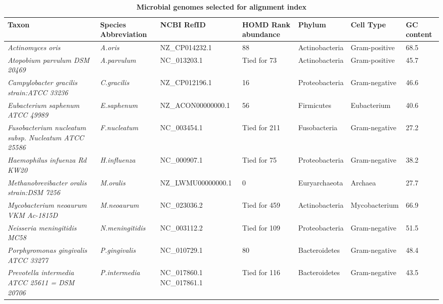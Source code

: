 \documentclass[12pt, a4paper]{article}
\renewcommand{\arraystretch}{1.2}
\newcommand{\ra}[1]{\renewcommand{\arraystretch}{#1}}
\begin{document}
\begin{landscape}
\begin{table}[h]
\centering\footnotesize
\ra{1.3}
\setlength{\tabcolsep}{6pt} %
	\caption[Microbial genomes selected for alignment index]{\textbf{Microbial genomes selected for alignment index}}\label{table:15microbes}
		\begin{tabular}{C{7cm} C{2.5cm} C{3.5cm} C{2cm} C{2.5cm} C{2.5cm} C{1.5cm} }
		\toprule
		\Centering\bfseries Taxon & \Centering\bfseries Species Abbreviation & \Centering\bfseries NCBI RefID & \Centering\bfseries HOMD Rank abundance & \Centering\bfseries Phylum & \Centering\bfseries Cell Type & \Centering\bfseries GC content \\[5pt] \midrule
		{\textit{Actinomyces oris}}&{\textit{A.oris}}&{NZ\_CP014232.1}&{88}&{Actinobacteria}&{Gram-positive}&{68.5}\\[5pt]
		{\textit{Atopobium parvulum DSM 20469}}&{\textit{A.parvulum}}&{NC\_013203.1}&{Tied for 73}&{Actinobacteria}&{Gram-positive}&{45.7}\\[5pt]
		{\textit{Campylobacter gracilis strain:ATCC 33236}}&{\textit{C.gracilis}}&{NZ\_CP012196.1}&{16}&{Proteobacteria}&{Gram-negative}&{46.6}\\[5pt]
		{\textit{Eubacterium saphenum ATCC 49989}}&{\textit{E.saphenum}}&{NZ\_ACON00000000.1}&{56}&{Firmicutes}&{Eubacterium}&{40.6}\\[5pt]
		{\textit{Fusobacterium nucleatum subsp. Nucleatum ATCC 25586}}&{\textit{F.nucleatum}}&{NC\_003454.1}&{Tied for 211}&{Fusobacteria}&{Gram-negative}&{27.2}\\[5pt]
		{\textit{Haemophilus infuenza Rd KW20}}&{\textit{H.influenza}}&{NC\_000907.1}&{Tied for 75}&{Proteobacteria}&{Gram-negative}&{38.2}\\[5pt]
		{\textit{Methanobrevibacter oralis strain:DSM 7256}}&{\textit{M.oralis}}&{NZ\_LWMU00000000.1}&{0}&{Euryarchaeota}&{Archaea}&{27.7}\\[5pt]
		{\textit{Mycobacterium neoaurum VKM Ac-1815D}}&{\textit{M.neoaurum}}&{NC\_023036.2}&{Tied for 459}&{Actinobacteria}&{Mycobacterium}&{66.9}\\[5pt]
		{\textit{Neisseria meningitidis MC58}}&{\textit{N.meningitidis}}&{NC\_003112.2}&{Tied for 109}&{Proteobacteria}&{Gram-negative}&{51.5}\\[5pt]
		{\textit{Porphyromonas gingivalis ATCC 33277}}&{\textit{P.gingivalis}}&{NC\_010729.1}&{80}&{Bacteroidetes}&{Gram-negative}&{48.4}\\[5pt]
		{\textit{Prevotella intermedia ATCC 25611 = DSM 20706}}&{\textit{P.intermedia}}&{NC\_017860.1 NC\_017861.1}&{Tied for 116}&{Bacteroidetes}&{Gram-negative}&{43.5}\\[5pt]

\end{tabular}
\end{table}
\end{landscape}
\end{document}
